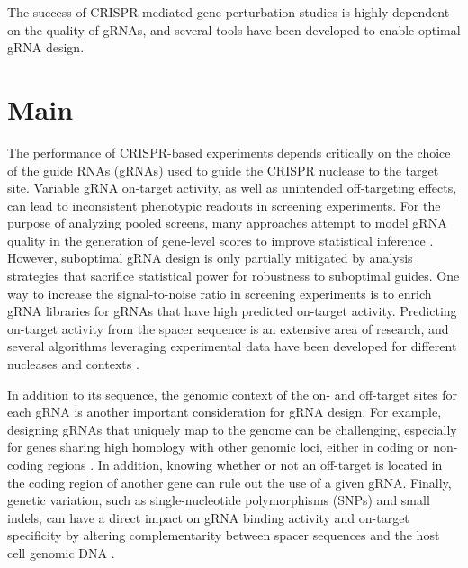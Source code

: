 \documentclass[pdftex,english,10pt]{article}
\begin{document}
The success of CRISPR-mediated gene perturbation studies is highly dependent on the quality of gRNAs, and several tools have been developed to enable optimal gRNA design. 


\section{Main}


The performance of CRISPR-based experiments depends critically on the choice of the guide RNAs (gRNAs) used to guide the CRISPR nuclease to the target site.
Variable gRNA on-target activity, as well as unintended off-targeting effects, can lead to inconsistent phenotypic readouts in screening experiments. 
For the purpose of analyzing pooled screens, many approaches attempt to model gRNA quality in the generation of gene-level scores to improve statistical inference \citep{ceres, bagel2, chronos, jacks, mageckmle}. However, suboptimal gRNA design is only partially mitigated by analysis strategies that sacrifice statistical power for robustness to suboptimal guides. One way to increase the signal-to-noise ratio in screening experiments is to enrich gRNA libraries for gRNAs that have high predicted on-target activity.  Predicting on-target activity from the spacer sequence is an extensive area of research, and several algorithms leveraging experimental data have been developed for different nucleases and contexts \citep{doench2016optimized, doench2014rational,azimuth,deepcas9, deepcpf1,toronto, crisprscan, crispria}. 

In addition to its sequence, the genomic context of the on- and off-target sites for each gRNA is another important consideration for gRNA design. For example, designing gRNAs that uniquely map to the genome can be challenging, especially for genes sharing high homology with other genomic loci, either in coding or non-coding regions \citep{fortin2019}. In addition, knowing whether or not an off-target is located in the coding region of another gene can rule out the use of a given gRNA. Finally, genetic variation, such as single-nucleotide polymorphisms (SNPs) and small indels, can have a direct impact on gRNA binding activity and on-target specificity by altering complementarity between spacer sequences and the host cell genomic DNA \citep{scott2017implications, lessard2017human, canver2017variant, wang2018genetic}.
\end{document}
